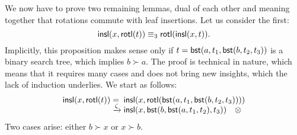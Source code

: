 We now have to prove two remaining lemmas, dual of each other and
meaning together that rotations commute with leaf insertions. Let us
consider the first:
\begin{equation*}
\textsf{insl}(x,\textsf{rotl}(t)) \equiv_3 \textsf{rotl}(\textsf{insl}(x,t)).
\end{equation*}
Implicitly, this proposition makes sense only if \(t=\textsf{bst}(a, t_1,
\textsf{bst}(b,t_2,t_3))\) is a binary search tree, which implies \(b
\succ a\). The proof is technical in nature, which means that it
requires many cases and does not bring new insights, which the lack of
induction underlies. We start as follows:
\begin{equation*}
\begin{array}{@{}r@{\;}l@{\;}l@{}}
  \fun{insl}(x,\fun{rotl}(t))
& = & \fun{insl}(x,\fun{rotl}(\fun{bst}(a, t_1,
\fun{bst}(b,t_2,t_3))))\\
& \xrightarrow{\smash{\zeta}} &
\fun{insl}(x,\fun{bst}(b,\fun{bst}(a,t_1,t_2),t_3)) \quad \otimes
\end{array}
\end{equation*}
Two cases arise: either \(b \succ x\) or \(x \succ b\).
